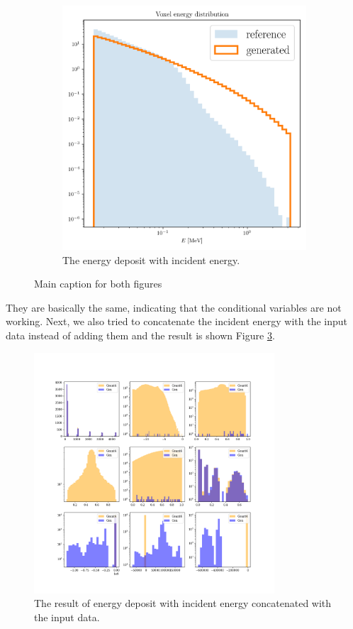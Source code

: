 \begin{figure}[htbp]
\begin{subfigure}[b]{0.45\textwidth}
        \includegraphics[width=\textwidth]{Figures/energy_voxel_full.png}
        \caption{The energy deposit with incident energy.}
        \label{fig:with_incident}
    \end{subfigure}
    
    \caption{Main caption for both figures}
    \label{fig:main}
\end{figure}

They are basically the same, indicating that the conditional variables are not working. Next, we also tried to concatenate the incident energy with the input data instead of adding them and the result is shown Figure \ref{fig:concatenate}.

\begin{figure}[ht]
    \centering
    \includegraphics[width=0.8\textwidth]{Figures/concatenate.png}
    \caption{The result of energy deposit with incident energy concatenated with the input data.} \label{fig:concatenate}
\end{figure}

